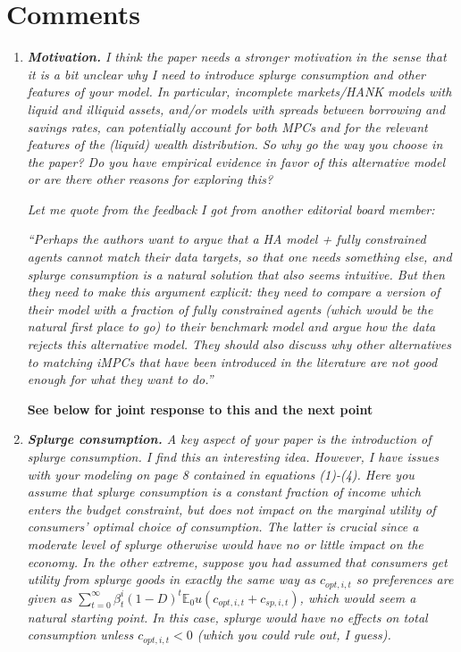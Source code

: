 \documentclass[12pt,letterpaper,english]{article}
\begin{document}
\section{Comments}
\begin{enumerate}
	
\item \textit{\textbf{Motivation.} I think the paper needs a stronger motivation in the sense that it is a bit unclear why I need to introduce splurge consumption and other features of your model. In particular, incomplete markets/HANK models with liquid and	illiquid assets, and/or models with spreads between borrowing and savings rates, can potentially account for both MPCs and for the relevant features of the (liquid)	wealth distribution. So why go the way you choose in the paper? Do you have empirical evidence in favor of this alternative model or are there other reasons for exploring this?}

\textit{Let me quote from the feedback I got from another editorial board member:}

\textit{``Perhaps the authors want to argue that a HA model + fully constrained agents	cannot match their data targets, so that one needs something else, and splurge	consumption is a natural solution that also seems intuitive. But then they need to make this argument explicit: they need to compare a version of their model with a fraction of fully constrained agents (which would be the natural first place to go)	to their benchmark model and argue how the data rejects this alternative model. They should also discuss why other alternatives to matching iMPCs that have been	introduced in the literature are not good enough for what they want to do.''}	

\noindent \textbf{See below for joint response to this and the next point}

\item \textit{\textbf{Splurge consumption.} A key aspect of your paper is the introduction of splurge consumption. I find this an interesting idea. However, I have issues with your modeling on page 8 contained in equations (1)-(4). Here you assume that	splurge  consumption is a constant fraction of income which enters the budget constraint, but does not impact on the marginal utility of consumers' optimal choice of consumption. The latter is crucial since a moderate level of splurge otherwise would have no or little impact on the economy. In the other extreme, suppose you had assumed that consumers get utility from splurge goods in exactly the same way as $c_{opt,i,t}$ so preferences are given as $\sum_{t=0}^{\infty} \beta^i_t (1 - D)^{t} \mathbb{E}_0 u(c_{opt,i,t} + c_{sp,i,t})$, which would seem a natural starting point. In this case, splurge would have no effects on total consumption unless $c_{opt,i,t} < 0$ (which you could rule out, I guess).} 


\end{enumerate}
\end{document}
